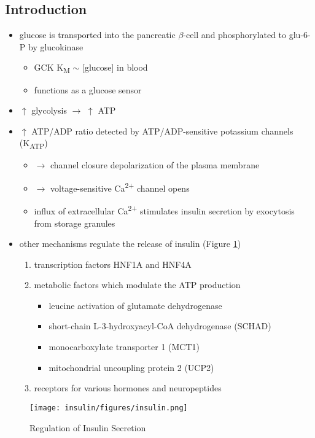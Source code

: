 \documentclass[12pt]{scrartcl}
\begin{document}
\subsection{Introduction}
\label{sec:orgcb5629a}
\begin{itemize}
\item glucose is transported into the pancreatic \(\beta\)-cell and phosphorylated to glu-6-P by glucokinase
\begin{itemize}
\item GCK K\textsubscript{M} \(\sim\) [glucose] in blood
\item functions as a glucose sensor
\end{itemize}
\item \(\uparrow\) glycolysis \(\to\) \(\uparrow\) ATP
\item \(\uparrow\) ATP/ADP ratio detected by ATP/ADP-sensitive potassium channels (K\textsubscript{ATP})
\begin{itemize}
\item \(\to\) channel closure depolarization of the plasma membrane
\item \(\to\) voltage-sensitive Ca\textsuperscript{2+} channel opens
\item influx of extracellular Ca\textsuperscript{2+} stimulates insulin secretion by
exocytosis from storage granules
\end{itemize}

\item other mechanisms regulate the release of insulin (Figure \ref{fig:org327c778})
\begin{enumerate}
\item transcription factors HNF1A and HNF4A
\item metabolic factors which modulate the ATP production
\begin{itemize}
\item leucine activation of glutamate dehydrogenase
\item short-chain L-3-hydroxyacyl-CoA dehydrogenase (SCHAD)
\item monocarboxylate transporter 1 (MCT1)
\item mitochondrial uncoupling protein 2 (UCP2)
\end{itemize}
\item receptors for various hormones and neuropeptides
\end{enumerate}
\end{itemize}



\begin{figure}[htbp]
\centering
\texttt{[image: insulin/figures/insulin.png]}
\caption[insulin]{\label{fig:org327c778}Regulation of Insulin Secretion}
\end{figure}
\end{document}

